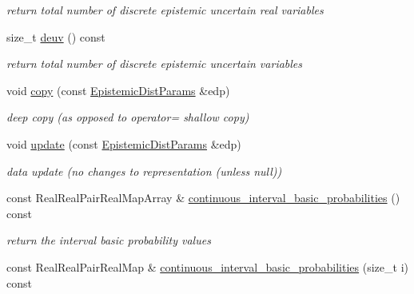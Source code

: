 \begin{DoxyCompactItemize}
\begin{DoxyCompactList}\small\item\em return total number of discrete epistemic uncertain real variables \end{DoxyCompactList}\item 
size\+\_\+t \hyperlink{classPecos_1_1EpistemicDistParams_a3b5119d9164fd536a51500137c3522ca}{deuv} () const \label{classPecos_1_1EpistemicDistParams_a3b5119d9164fd536a51500137c3522ca}

\begin{DoxyCompactList}\small\item\em return total number of discrete epistemic uncertain variables \end{DoxyCompactList}\item 
void \hyperlink{classPecos_1_1EpistemicDistParams_ac07244686fa7a745617167aaae7dc2f1}{copy} (const \hyperlink{classPecos_1_1EpistemicDistParams}{Epistemic\+Dist\+Params} \&edp)\label{classPecos_1_1EpistemicDistParams_ac07244686fa7a745617167aaae7dc2f1}

\begin{DoxyCompactList}\small\item\em deep copy (as opposed to operator= shallow copy) \end{DoxyCompactList}\item 
void \hyperlink{classPecos_1_1EpistemicDistParams_a46786dc519d291b28119cd39fa5f47be}{update} (const \hyperlink{classPecos_1_1EpistemicDistParams}{Epistemic\+Dist\+Params} \&edp)\label{classPecos_1_1EpistemicDistParams_a46786dc519d291b28119cd39fa5f47be}

\begin{DoxyCompactList}\small\item\em data update (no changes to representation (unless null)) \end{DoxyCompactList}\item 
const Real\+Real\+Pair\+Real\+Map\+Array \& \hyperlink{classPecos_1_1EpistemicDistParams_adf39419d5f98afe9ade91fb12f504e70}{continuous\+\_\+interval\+\_\+basic\+\_\+probabilities} () const \label{classPecos_1_1EpistemicDistParams_adf39419d5f98afe9ade91fb12f504e70}

\begin{DoxyCompactList}\small\item\em return the interval basic probability values \end{DoxyCompactList}\item 
const Real\+Real\+Pair\+Real\+Map \& \hyperlink{classPecos_1_1EpistemicDistParams_ab09bde881523a715cf5fb5afe50f70d7}{continuous\+\_\+interval\+\_\+basic\+\_\+probabilities} (size\+\_\+t i) const \label{classPecos_1_1EpistemicDistParams_ab09bde881523a715cf5fb5afe50f70d7}


\end{DoxyCompactItemize}
